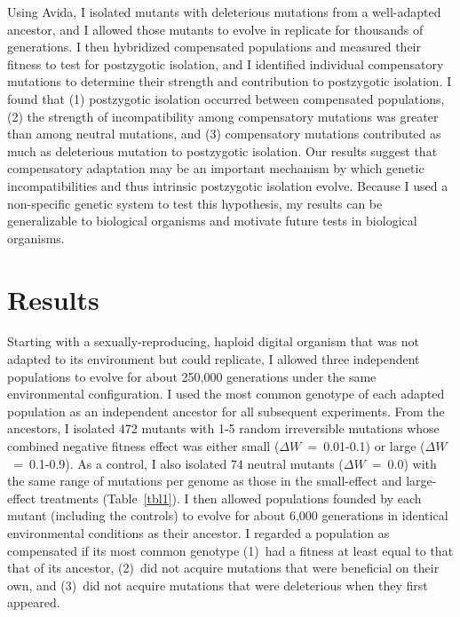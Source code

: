 \begin{doublespace}
Using Avida, I isolated mutants with deleterious mutations
from a well-adapted ancestor, and I allowed those mutants to evolve
in replicate for thousands of generations.
%
I then hybridized compensated populations and measured their fitness
to test for postzygotic isolation,
and I identified individual compensatory mutations to determine
their strength and contribution to postzygotic isolation.
%
I found that (1) postzygotic isolation occurred between compensated populations,
(2) the strength of incompatibility among compensatory mutations
was greater than among neutral mutations, and
(3) compensatory mutations contributed as much as deleterious mutation
to postzygotic isolation.
%
Our results suggest that compensatory adaptation may be an important
mechanism by which genetic incompatibilities and
thus intrinsic postzygotic isolation evolve.
%
Because I used a non-specific genetic system to test this hypothesis,
my results can be generalizable to biological organisms and motivate
future tests in biological organisms.



\section{Results}

Starting with a sexually-reproducing, haploid digital organism
that was not adapted to its environment but could replicate,
I allowed three independent populations to evolve
for about 250,000 generations under the same environmental configuration.
%
I used the most common genotype of each adapted population
as an independent ancestor for all subsequent experiments.
%
From the ancestors, I isolated 472 mutants
with 1-5 random irreversible mutations
whose combined negative fitness effect was either
small ($\Delta W$~=~0.01-0.1) or large ($\Delta W$~=~0.1-0.9).
%
As a control, I also isolated 74 neutral mutants ($\Delta W$~=~0.0)
with the same range of mutations per genome as those
in the small-effect and large-effect treatments (Table~\ref{tbl1}).
%
I then allowed populations founded by each mutant (including the controls)
to evolve for about 6,000 generations
in identical environmental conditions as their ancestor.
%
I regarded a population as compensated if its most common genotype
(1)~had a fitness at least equal to that that of its ancestor,
(2)~did not acquire mutations that were beneficial on their own, and
(3)~did not acquire mutations that were deleterious when they first appeared.




\end{doublespace}

